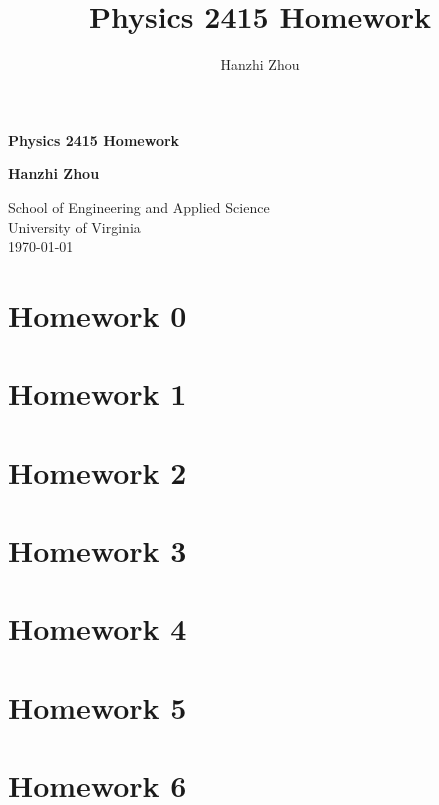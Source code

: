 \documentclass[12pt]{article}
\title{Physics 2415 Homework}
\author{Hanzhi Zhou}
\begin{document}
\begin{titlepage}
	\begin{center}
		\vspace*{1cm}

		\Huge\textbf{Physics 2415 Homework}


		\vspace{1.5cm}

		\textbf{Hanzhi Zhou}

		\vfill
		\vspace{0.8cm}

		\Large
		School of Engineering and Applied Science\\
		\vspace{0.2cm}
		University of Virginia\\
		\vspace{0.2cm}
		\today
		\vspace{1cm}
	\end{center}
	\clearpage
\end{titlepage}

\doublespacing
\tableofcontents
\newpage
\singlespacing

\section{Homework 0}



\newpage

\section{Homework 1}




\newpage

\section{Homework 2}




\newpage

\section{Homework 3}




\newpage

\section{Homework 4}



\newpage

\section{Homework 5}



\newpage

\section{Homework 6}

\end{document}
